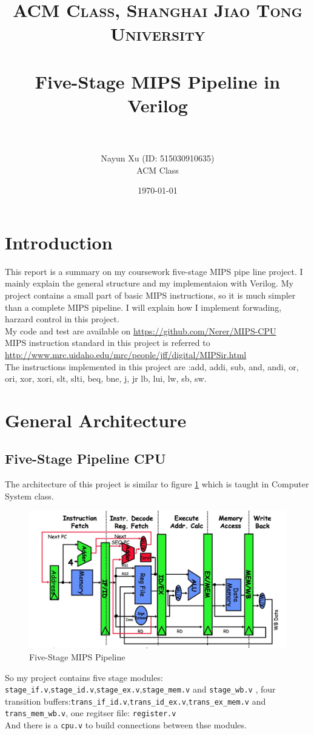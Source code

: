 \documentclass[paper=a4, fontsize=11pt]{scrartcl} %
\title{	
\normalfont \normalsize 
\textsc{ACM Class, Shanghai Jiao Tong University} \\ %
\horrule{0.5pt} \\[0.4cm] %
\huge Five-Stage MIPS Pipeline in Verilog\\ %
\horrule{2pt} \\ %
}
\author{
\normalsize
	Nayun Xu (ID: 515030910635)\\
\normalsize
	ACM Class
} %
\date{\normalsize\today} %
\numberwithin{equation}{section} %
\numberwithin{figure}{section} %
\numberwithin{table}{section} %
\begin{document}
\maketitle %
\begin{spacing}{1.5}
\renewcommand{\contentsname}{\scshape \bfseries \Large Contents}
\tableofcontents

\newpage
\section{Introduction}
	This report is a summary on my coursework five-stage MIPS pipe line project. I mainly explain the general structure and my implementaion with Verilog. My project contains a small part of basic MIPS instructions, so it is much simpler than a complete MIPS pipeline. I will explain how I implement forwading, harzard control in this project.\\
	My code and test are available on  \url{https://github.com/Nerer/MIPS-CPU}\\
	MIPS instruction standard in this project is referred to \url{http://www.mrc.uidaho.edu/mrc/people/jff/digital/MIPSir.html}\\
	The instructions implemented in this project are :add, addi, sub, and, andi, or, ori, xor, xori, slt, slti, beq, bne, j, jr lb, lui, lw, sb, sw.
\newpage
\section{General Architecture}
	\subsection{Five-Stage Pipeline CPU}
		The architecture of this project is similar to figure \ref{fig::mips} which is taught in Computer System class.
		\begin{figure}[H]
			\centering
			\includegraphics[width = 13 cm]{mips}
			\caption{Five-Stage MIPS Pipeline}
			\label{fig::mips}
		\end{figure}
		So my project contains five stage modules: \verb|stage_if.v|,\verb|stage_id.v|,\verb|stage_ex.v|,\verb|stage_mem.v| and \verb|stage_wb.v|
		, four transition buffers:\verb|trans_if_id.v|,\verb|trans_id_ex.v|,\verb|trans_ex_mem.v| and \verb|trans_mem_wb.v|, one regitser file: \verb|register.v|\\
		And there is a \verb|cpu.v| to build connections between thse modules.

\end{spacing}
\end{document}
